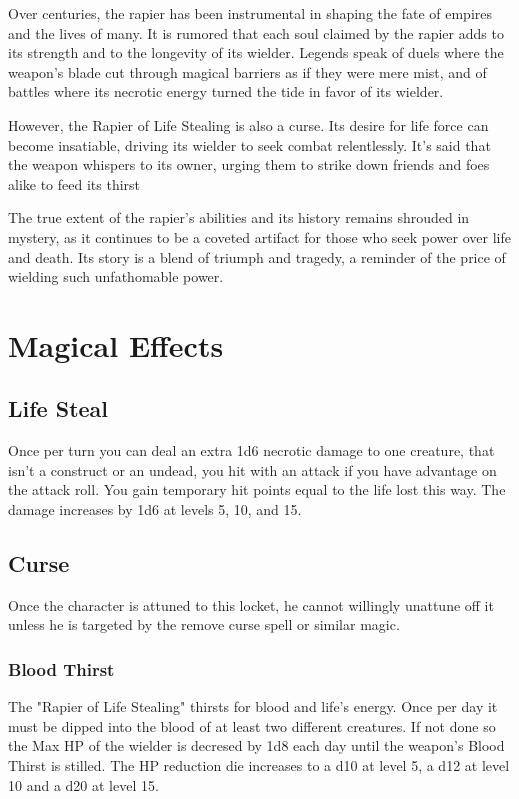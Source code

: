 Over centuries, the rapier has been instrumental in shaping the fate of empires and the lives of many. It is rumored that each soul claimed by the rapier adds to its strength and to the longevity of its wielder. Legends speak of duels where the weapon's blade cut through magical barriers as if they were mere mist, and of battles where its necrotic energy turned the tide in favor of its wielder.

However, the Rapier of Life Stealing is also a curse. Its desire for life force can become insatiable, driving its wielder to seek combat relentlessly. It's said that the weapon whispers to its owner, urging them to strike down friends and foes alike to feed its thirst

The true extent of the rapier's abilities and its history remains shrouded in mystery, as it continues to be a coveted artifact for those who seek power over life and death. Its story is a blend of triumph and tragedy, a reminder of the price of wielding such unfathomable power.

\section*{Magical Effects}
\subsection*{Life Steal}
Once per turn you can deal an extra 1d6 necrotic damage to one creature, that isn't a construct or an undead, you hit with an attack if you have advantage on the attack roll. You gain temporary hit points equal to the life lost this way. The damage increases by 1d6 at levels 5, 10, and 15.
\subsection*{Curse}
Once the character is attuned to this locket, he cannot willingly unattune off it unless he is targeted by the remove curse spell or similar magic.
\subsubsection*{Blood Thirst}
The "Rapier of Life Stealing" thirsts for blood and life's energy. Once per day it must be dipped into the blood of at least two different creatures. If not done so the Max HP of the wielder is decresed by 1d8 each day until the weapon's Blood Thirst is stilled. The HP reduction die increases to a d10 at level 5, a d12 at level 10 and a d20 at level 15.
